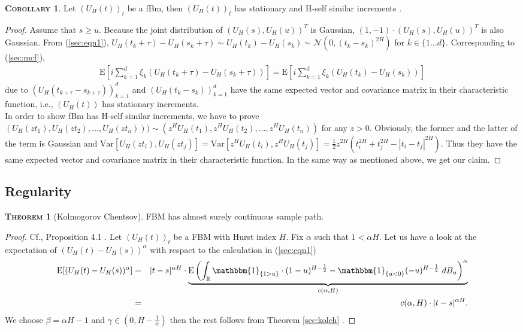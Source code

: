 \documentclass[a4paper, twoside, 11pt]{article}
\theoremstyle{definition}
\newtheorem{theorem}[definition]{\scshape Theorem}
\newtheorem{corollary}[definition]{\scshape Corollary}
\newcommand{\brkt}[1]{\left({#1} \right)}
\begin{document}
\begin{corollary}
  Let $(U_H(t))_{t}$ be a fBm, then $(U_H(t))_{t}$ has stationary and H-self similar increments . 
\end{corollary}
\begin{proof}
  Assume that $s \ge u $. Because the joint distribution of $(U_H(s), U_H(u))^T$ is Gaussian, $(1, -1) \cdot (U_H(s), U_H(u))^T $ is also Gaussian. From (\ref{sec:eqn1}),  $U_H(t_k+\tau) - U_H(s_k+\tau) \sim U_H(t_k) - U_H(s_k) \sim \mathcal{N}(0, (t_k - s_k)^{2H})$ for $k \in \{1\dots d\}$. Corresponding to  (\ref{sec:mcf}), 
	\begin{eqnarray*}
	\mathrm{E}[i\sum_{k=1}^{d}\xi_k (U_H(t_k + \tau) - U_H(s_k + \tau))] = \mathrm{E} [i\sum_{k=1}^{d}\xi_k (U_H(t_k) - U_H(s_k))]
  \end{eqnarray*}
  due to $(U_H(t_{k+\tau} - s_{k+\tau}))_{k=1}^{d}$ and $(U_H(t_k - s_k))_{k=1}^{d}$ have the same expected vector and covariance matrix in their characteristic function, i.e., $(U_H(t))$ has stationary increments.\\
   In order to show fBm has H-self similar increments, we have to prove\\ $(U_H(zt_1), U_H(zt_2),\dots, U_H(zt_n))) \sim (z^HU_H(t_1), z^HU_H(t_2),\dots, z^HU_H(t_n))$ for any $z > 0$. Obviously, the former and the latter of the term is Gaussian and $\mathrm{Var}[U_H(zt_i), U_H(zt_j)] = \mathrm{Var}[z^HU_H(t_i), z^HU_H(t_j)] = \frac{1}{2}z^{2H}(t_i^{2H} + t_j^{2H} - |t_i-t_j|^{2H})$. Thus they have the same expected vector and covariance matrix in their characteristic function. In the same way as mentioned above, we get our claim.
\end{proof}

\subsection{Regularity}
\begin{theorem}[Kolmogorov Chentsov]
  FBM has almost surely continuous sample path.  
\end{theorem}

\begin{proof}
  Cf.\cite{mandelbrot}, Proposition 4.1 . Let $(U_H(t))_{t}$ be a FBM with Hurst index $H$. Fix $\alpha$ such that $1 < \alpha H$. Let us have a look at the expectation of $(U_H(t) - U_H(s))^\alpha$ with respact to the calculation in (\ref{sec:eqn1})
  \begin{eqnarray}
	\mathrm{E} [(U_H(t) - U_H(s))^\alpha] &=& |t-s|^{\alpha H} \cdot \underbrace{\mathrm{E}\brkt{\int_{\mathbb{R}} \mathbbm{1}_{\{1 > u\}}\cdot (1-u)^{H-\frac{1}{2}} - \mathbbm{1}_{\{u < 0\}} (-u)^{H-\frac{1}{2}} \, \mathop{dB_u}}^\alpha}_{c(\alpha,H)}\nonumber\\
	&=& c(\alpha,H) \cdot |t-s|^{\alpha H}.
	\label{sec:eqn5}
  \end{eqnarray}
  We choose $\beta = \alpha H -1$ and $\gamma \in (0, H-\frac{1}{\alpha})$ then the rest follows from Theorem \ref{sec:kolch} .
\end{proof}
\end{document}
